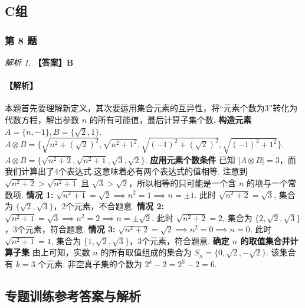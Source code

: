 \documentclass[12pt,a4paper]{ctexbook}
\theoremstyle{definition}
\theoremstyle{remark}
\newtheorem*{solution}{解析}
\begin{document}
	\subsection*{C组}
	
	\subsubsection*{第 8 题}
	\begin{solution}
		\textbf{【答案】B}
		\paragraph{【解析】}
		本题首先要理解新定义，其次要运用集合元素的互异性，将“元素个数为3”转化为代数方程，解出参数 $n$ 的所有可能值，最后计算子集个数.
		\textbf{构造元素}
		$A=\{n, -1\}, B=\{\sqrt{2}, 1\}$.
		$A \otimes B = \{\sqrt{n^2 + (\sqrt{2})^2}, \sqrt{n^2 + 1^2}, \sqrt{(-1)^2 + (\sqrt{2})^2}, \sqrt{(-1)^2 + 1^2}\}$.
		$A \otimes B = \{\sqrt{n^2+2}, \sqrt{n^2+1}, \sqrt{3}, \sqrt{2}\}$.
		\textbf{应用元素个数条件}
		已知 $|A \otimes B| = 3$，而我们计算出了4个表达式.这意味着必有两个表达式的值相等.
		注意到 $\sqrt{n^2+2} > \sqrt{n^2+1}$ 且 $\sqrt{3} > \sqrt{2}$，所以相等的只可能是一个含 $n$ 的项与一个常数项.
		\textbf{情况 1:} $\sqrt{n^2+1} = \sqrt{2} \implies n^2=1 \implies n=\pm 1$. 此时 $\sqrt{n^2+2}=\sqrt{3}$, 集合为 $\{\sqrt{2}, \sqrt{3}\}$，2个元素，不合题意.
		\textbf{情况 2:} $\sqrt{n^2+1} = \sqrt{3} \implies n^2=2 \implies n=\pm \sqrt{2}$. 此时 $\sqrt{n^2+2}=2$, 集合为 $\{2, \sqrt{2}, \sqrt{3}\}$，3个元素，符合题意.
		\textbf{情况 3:} $\sqrt{n^2+2} = \sqrt{2} \implies n^2=0 \implies n=0$. 此时 $\sqrt{n^2+1}=1$, 集合为 $\{1, \sqrt{2}, \sqrt{3}\}$，3个元素，符合题意.
		\textbf{确定 $n$ 的取值集合并计算子集}
		由上可知，实数 $n$ 的所有取值组成的集合为 $S_n = \{0, \sqrt{2}, -\sqrt{2}\}$.
		该集合有 $k=3$ 个元素.
		非空真子集的个数为 $2^k - 2 = 2^3 - 2 = 6$.
	\end{solution}
	
	\subsection*{专题训练参考答案与解析}
	
\end{document}
